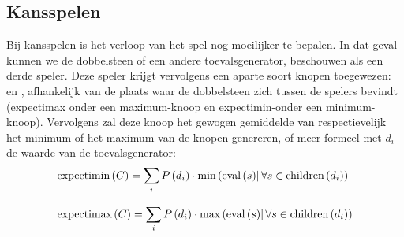 \subsection{Kansspelen}
Bij kansspelen is het verloop van het spel nog moeilijker te bepalen. In dat geval kunnen we de dobbelsteen of een andere toevalsgenerator, beschouwen als een derde speler. Deze speler krijgt vervolgens een aparte soort knopen toegewezen:  en , afhankelijk van de plaats waar de dobbelsteen zich tussen de spelers bevindt (expectimax onder een maximum-knoop en expectimin-onder een minimum-knoop). Vervolgens zal deze knoop het gewogen gemiddelde van respectievelijk het minimum of het maximum van de knopen genereren, of meer formeel met $d_i$ de waarde van de toevalsgenerator:
\begin{equation}
\begin{array}{l}
\mbox{expectimin}\left( C \right)=\displaystyle\sum_{i}{P\left(d_i\right)\cdot\mbox{min}\left(\mbox{eval}\left( s \right)\right|\forall s\in\mbox{children}\left( d_i \right))}\\\\
\mbox{expectimax}\left( C \right)=\displaystyle\sum_{i}{P\left(d_i\right)\cdot\mbox{max}\left(\mbox{eval}\left( s \right)\right|\forall s\in\mbox{children}\left( d_i \right))}
\end{array}
\end{equation}